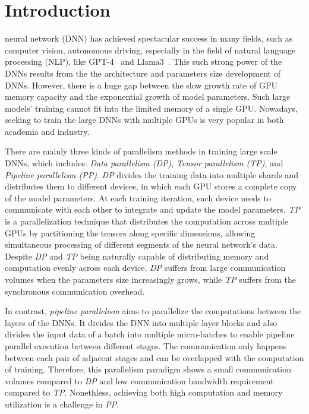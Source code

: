 \section{Introduction}
 neural network (DNN) has achieved spectacular success in many fields,
such as computer vision, autonomous driving,
especially in the field of natural language processing (NLP),
like GPT-4~\cite{achiam2023gpt} and Llama3~\cite{dubey2024llama}.
This such strong power of the DNNs results from the
the architecture and parameters size development of DNNs.
However, there is a huge gap between the slow growth rate
of GPU memory capacity and the exponential growth of model parameters.
Such large models' training cannot fit into the limited memory of a single GPU.
Nowadays, seeking to train the large DNNs with multiple GPUs
is very popular in both academia and industry.

There are mainly three kinds of parallelism methods in
training large scale DNNs, which includes: \emph{Data parallelism (DP)},
\emph{Tensor parallelism (TP)}, and \emph{Pipeline parallelism (PP)}.
\emph{DP} divides the training data into multiple shards and distributes them to different devices,
in which each GPU stores a complete copy of the model parameters.
At each training iteration, each device needs to communicate with each other
to integrate and update the model parameters.
\emph{TP} is a parallelization technique that distributes the computation across
multiple GPUs by partitioning the tensors along specific dimensions,
allowing simultaneous processing of different segments of the neural network's data.
Despite \emph{DP} and \emph{TP} being naturally capable of
distributing memory and computation evenly across each device,
\emph{DP} suffers from large communication volumes
when the parameters size increasingly grows,
while \emph{TP} suffers from the synchronous
communication overhead.

In contrast, \emph{pipeline parallelism} aims to parallelize the computations
between the layers of the DNNs.
It divides the DNN into multiple layer blocks
and also divides the input data of a batch into multiple micro-batches
to enable pipeline parallel execution between different stages.
The communication only happens between each pair of adjacent stages
and can be overlapped with the computation of training.
Therefore, this parallelism paradigm shows a small communication volumes
compared to \emph{DP} and low communication bandwidth requirement compared to \emph{TP}.
Nonethless, achieving both high computation and memory utilization
is a challenge in \emph{PP}.

